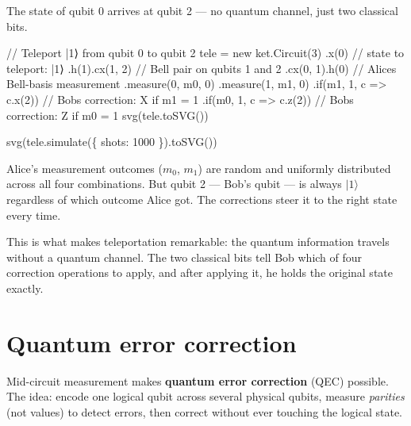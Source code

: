 \documentclass[
  11pt,
  letterpaper,
  oneside]{scrbook}
\newenvironment{Shaded}{\begin{snugshade}}{\end{snugshade}}
\newcommand{\NormalTok}[1]{\textcolor[rgb]{0.00,0.23,0.31}{#1}}
\begin{document}
The state of qubit 0 arrives at qubit 2 --- no quantum channel, just two
classical bits.

\begin{Shaded}
\begin{Highlighting}[]
\NormalTok{// Teleport |1⟩ from qubit 0 to qubit 2}
\NormalTok{tele = new ket.Circuit(3)}
\NormalTok{  .x(0)                         // state to teleport: |1⟩}
\NormalTok{  .h(1).cx(1, 2)                // Bell pair on qubits 1 and 2}
\NormalTok{  .cx(0, 1).h(0)                // Alice\textquotesingle{}s Bell{-}basis measurement}
\NormalTok{  .measure(0, \textquotesingle{}m0\textquotesingle{}, 0)}
\NormalTok{  .measure(1, \textquotesingle{}m1\textquotesingle{}, 0)}
\NormalTok{  .if(\textquotesingle{}m1\textquotesingle{}, 1, c =\textgreater{} c.x(2))    // Bob\textquotesingle{}s correction: X if m1 = 1}
\NormalTok{  .if(\textquotesingle{}m0\textquotesingle{}, 1, c =\textgreater{} c.z(2))    // Bob\textquotesingle{}s correction: Z if m0 = 1}
\NormalTok{svg(tele.toSVG())}
\end{Highlighting}
\end{Shaded}

\begin{Shaded}
\begin{Highlighting}[]
\NormalTok{svg(tele.simulate(\{ shots: 1000 \}).toSVG())}
\end{Highlighting}
\end{Shaded}

Alice's measurement outcomes (\(m_0\), \(m_1\)) are random and uniformly
distributed across all four combinations. But qubit 2 --- Bob's qubit
--- is always \(|1\rangle\) regardless of which outcome Alice got. The
corrections steer it to the right state every time.

This is what makes teleportation remarkable: the quantum information
travels without a quantum channel. The two classical bits tell Bob which
of four correction operations to apply, and after applying it, he holds
the original state exactly.

\section{Quantum error correction}\label{quantum-error-correction}

Mid-circuit measurement makes \textbf{quantum error correction} (QEC)
possible. The idea: encode one logical qubit across several physical
qubits, measure \emph{parities} (not values) to detect errors, then
correct without ever touching the logical state.
\end{document}
